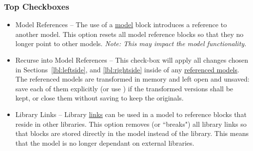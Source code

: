 \documentclass{article}
\begin{document}
\subsubsection{Top Checkboxes}
\begin{itemize}
	\item Model References -- The use of a \href{https://www.mathworks.com/help/simulink/slref/model.html}{model} block introduces a reference to another model. This option resets all model reference blocks so that they no longer point to other models. \emph{Note: This may impact the model functionality.}
	\item Recurse into Model References -- This check-box will apply all changes chosen in Sections~\ref{lbl:leftside}, and \ref{lbl:rightside} inside of any \href{https://de.mathworks.com/help/simulink/model-reference.html}{referenced models}. The referenced models are transformed in memory and left open and unsaved: save each of them explicitly (or use ) if the transformed versions shall be kept, or close them without saving to keep the originals.
	\item Library Links -- Library \href{https://www.mathworks.com/help/simulink/ug/creating-and-working-with-linked-blocks.html}{links} can be used in a model to reference blocks that reside in other libraries. This option removes (or ``breaks") all library links so that blocks are stored directly in the model instead of the library. This means that the model is no longer dependant on external libraries.
\end{itemize}
\end{document}
